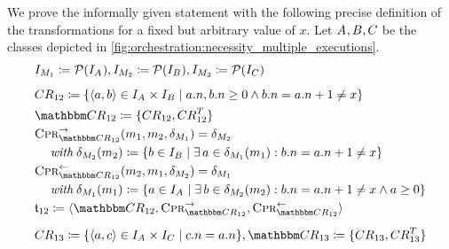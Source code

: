 We prove the informally given statement with the following precise definition of the transformations for a fixed but arbitrary value of $x$.
Let $\class{A}{}, \class{B}{}, \class{C}{}$ be the classes depicted in \autoref{fig:orchestration:necessity_multiple_executions}.
\begin{align*}
    & 
    \metamodelinstanceset{M}{1} \equalsperdefinition \mathcal{P}(\instances{\class{A}{}}), %
    \metamodelinstanceset{M}{2} \equalsperdefinition \mathcal{P}(\instances{\class{B}{}}), %
    \metamodelinstanceset{M}{3} \equalsperdefinition \mathcal{P}(\instances{\class{C}{}}) \\[0.5em]
    &
    \consistencyrelation{CR}{12} \equalsperdefinition \setted{\tupled{a,b} \in \instances{\class{A}{}} \times \instances{\class{B}{}} \mid a.n, b.n \ge 0 \land b.n = a.n + 1 \neq x}\\
    &
    \consistencyrelationset{CR}_{12} \equalsperdefinition \setted{\consistencyrelation{CR}{12}, \consistencyrelation{CR}{12}^T} \\
    &
    \consistencypreservationrule{\consistencyrelationset{CR}_{12}}^{\rightarrow}(\model{m}{1}, \model{m}{2}, \change{\metamodel{M}{1}}) = \change{\metamodel{M}{2}} \\
    & \formulaskip
    \withmath \change{\metamodel{M}{2}}(\model{m}{2}) \equalsperdefinition \setted{b \in \instances{\class{B}{}} \mid \exists a \in \change{\metamodel{M}{1}}(\model{m}{1}) : b.n = a.n + 1 \neq x} \\
    & 
    \consistencypreservationrule{\consistencyrelationset{CR}_{12}}^{\leftarrow}(\model{m}{2}, \model{m}{1}, \change{\metamodel{M}{2}}) = \change{\metamodel{M}{1}} \\
    & \formulaskip
    \withmath \change{\metamodel{M}{1}}(\model{m}{1}) \equalsperdefinition \setted{a \in \instances{\class{A}{}} \mid \exists b \in \change{\metamodel{M}{2}}(\model{m}{2}) : b.n = a.n + 1 \neq x \land a \geq 0} \\
    &
    \transformation{t}_{12} \equalsperdefinition \tupled{\consistencyrelationset{CR}_{12}, \consistencypreservationrule{\consistencyrelationset{CR}_{12}}^{\rightarrow}, \consistencypreservationrule{\consistencyrelationset{CR}_{12}}^{\leftarrow}} \\[0.5em]
    & 
    \consistencyrelation{CR}{13} \equalsperdefinition \setted{\tupled{a,c} \in \instances{\class{A}{}} \times \instances{\class{C}{}} \mid c.n = a.n}, \consistencyrelationset{CR}_{13} \equalsperdefinition \setted{\consistencyrelation{CR}{13}, \consistencyrelation{CR}{13}^T} \\

\end{align*}
